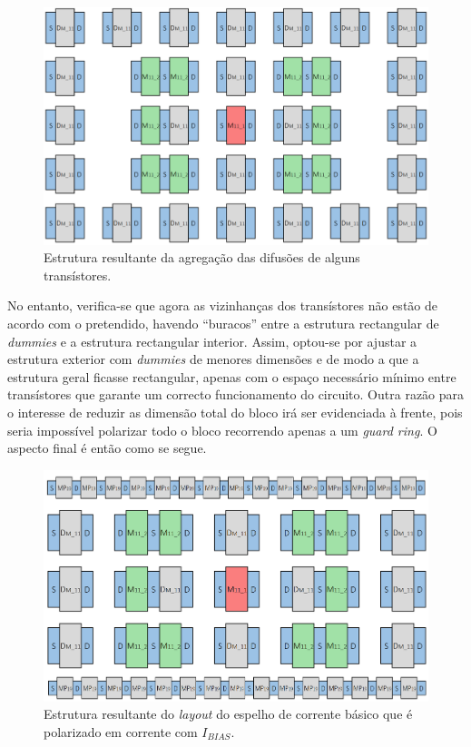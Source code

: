 \documentclass[11pt]{article}
\numberwithin{equation}{section}
\begin{document}
\begin{figure}[H]
	\centering
	\includegraphics[keepaspectratio=true, scale=0.30]{teoricas/layout/cc1_2}
	\vspace{-0.5em}
	\caption{Estrutura resultante da agregação das difusões de alguns transístores.}
	\vspace{-0.8em} 
\end{figure}

No entanto, verifica-se que agora as vizinhanças dos transístores não estão de acordo com o pretendido, havendo ``buracos'' entre a estrutura rectangular de \textit{dummies} e a estrutura rectangular interior. Assim, optou-se por ajustar a estrutura exterior com \textit{dummies} de menores dimensões  e de modo a que a estrutura geral ficasse rectangular, apenas com o espaço necessário mínimo entre transístores que garante um correcto funcionamento do circuito. Outra razão para o interesse de reduzir as dimensão total do bloco irá ser evidenciada à frente, pois seria impossível polarizar todo o bloco recorrendo apenas a um \textit{guard ring}. O aspecto final é então como se segue.

\begin{figure}[H]
	\centering
	\includegraphics[keepaspectratio=true, scale=0.30]{teoricas/layout/cc1_3}
	\vspace{-0.5em}
	\caption{Estrutura resultante do \textit{layout} do espelho de corrente básico que é polarizado em corrente com $I_{BIAS}$.}
	\vspace{-0.8em} 
\end{figure} 
\end{document}
